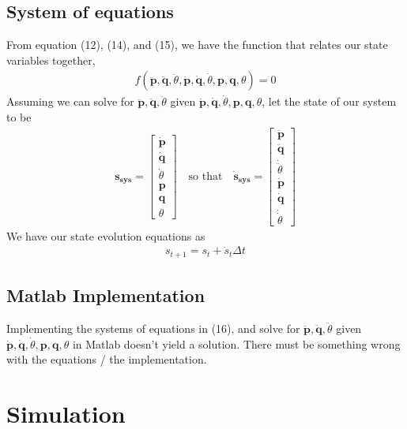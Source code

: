 \subsection{System of equations}
From equation (12), (14), and (15), we have the function that relates our state variables together,
\begin{align}
  f(\bm{\ddot{p}},\bm{\ddot{q}}, \ddot{\theta}, \bm{\dot{p}},\bm{\dot{q}}, \dot{\theta},\bm{p},\bm{q}, \theta) = 0
\end{align}
Assuming we can solve for $\bm{\ddot{p}},\bm{\ddot{q}}, \ddot{\theta}$ given $\bm{\dot{p}},\bm{\dot{q}}, \dot{\theta},\bm{p},\bm{q}, \theta$, let the state of our system to be
\begin{align*}
  \bm{s_{sys}} =
  \begin{bmatrix}
      \bm{\dot{p}} \\
      \bm{\dot{q}} \\
      \dot{\theta} \\
      \bm{p} \\
      \bm{q} \\
      \theta
  \end{bmatrix}
  \quad \text{so that} \quad
  \bm{\dot{s}_{sys}} =
    \begin{bmatrix}
      \bm{\ddot{p}} \\
      \bm{\ddot{q}} \\
      \dot{\ddot\theta} \\
      \bm{\dot{p}} \\
      \bm{\dot{q}} \\
      \dot{\dot{\theta}}
  \end{bmatrix}
\end{align*}
We have our state evolution equations as
\begin{align}
  s_{t+1} = s_{t} + \dot{s}_{t}\Delta t
\end{align}

\subsection{Matlab Implementation}
Implementing the systems of equations in (16), and solve for $\bm{\ddot{p}},\bm{\ddot{q}}, \ddot{\theta}$ given $\bm{\dot{p}},\bm{\dot{q}}, \dot{\theta},\bm{p},\bm{q}, \theta$ in Matlab doesn't yield a solution. There must be something wrong with the equations / the implementation.
\section{Simulation}
